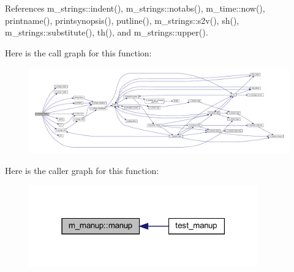 References m\+\_\+strings\+::indent(), m\+\_\+strings\+::notabs(), m\+\_\+time\+::now(), printname(), printsynopsis(), putline(), m\+\_\+strings\+::s2v(), sh(), m\+\_\+strings\+::substitute(), th(), and m\+\_\+strings\+::upper().

Here is the call graph for this function\+:
\nopagebreak
\begin{figure}[H]
\begin{center}
\leavevmode
\includegraphics[width=350pt]{namespacem__manup_a2d0a043fa0f6b2ca01e2eb4747ef4bbd_cgraph}
\end{center}
\end{figure}
Here is the caller graph for this function\+:
\nopagebreak
\begin{figure}[H]
\begin{center}
\leavevmode
\includegraphics[width=279pt]{namespacem__manup_a2d0a043fa0f6b2ca01e2eb4747ef4bbd_icgraph}
\end{center}
\end{figure}
